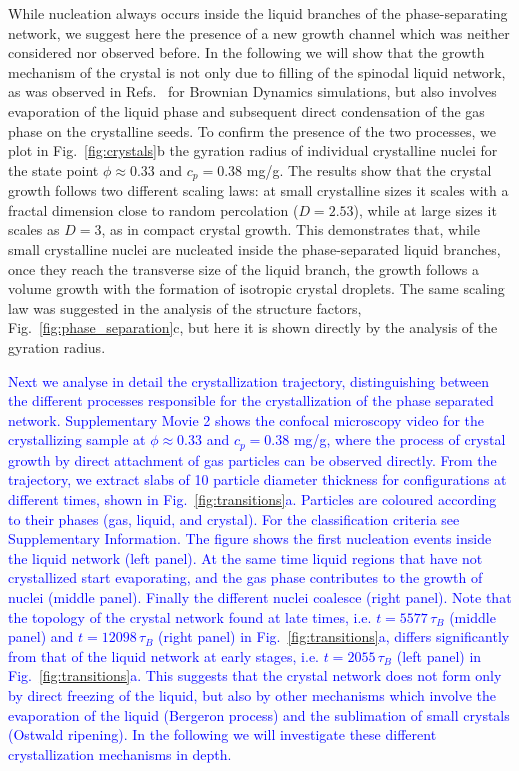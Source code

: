 \documentclass[preprint,amsmath,amssymb,superscriptaddress]{revtex4-1}
\begin{document}
While nucleation always occurs inside the liquid branches of the phase-separating network, we suggest here the presence of a new growth channel
which was neither considered nor observed before. In the following we will show that the growth mechanism of the crystal is not only due to filling of the spinodal liquid network, as was observed in Refs.~\cite{soga1999metastable,fortini2008crystallization,perez2011pathways} for Brownian Dynamics simulations, but also involves 
evaporation of the liquid phase and subsequent direct condensation of the gas phase on the crystalline seeds. 
To confirm the presence of the two processes, we plot in Fig.~\ref{fig:crystals}b the gyration radius of individual crystalline nuclei for the state point 
$\phi\approx 0.33$ and $c_p=0.38$ mg/g. The results show that the crystal growth follows two different scaling laws: at small crystalline sizes it scales with 
a fractal dimension close to random percolation ($D=2.53$), while at large sizes it scales as $D=3$, as in compact crystal growth. This demonstrates that, while 
small crystalline nuclei are nucleated inside the phase-separated liquid branches, once they reach the transverse size of the liquid branch, the growth 
follows a volume growth with the formation of isotropic crystal droplets. The same scaling law was suggested in the analysis of the
structure factors, Fig.~\ref{fig:phase_separation}c, but here it is shown directly by the analysis of the gyration radius. 

\textcolor{blue}{Next we analyse in detail the crystallization trajectory, distinguishing between the different processes responsible for the
crystallization of the phase separated network.
Supplementary Movie 2 shows the confocal microscopy video for the crystallizing sample at $\phi\approx 0.33$ and $c_p=0.38$ mg/g,
where the process of crystal growth by direct attachment of gas particles can be observed directly. 
From the trajectory, we extract slabs of 10 particle diameter thickness for configurations at different times, shown in Fig.~\ref{fig:transitions}a. 
Particles are coloured according to their phases (gas, liquid, and crystal). For the classification criteria see Supplementary Information. The figure shows the first nucleation 
events inside the liquid network (left panel). At the same time liquid regions that have not crystallized start evaporating, and the gas phase contributes to the growth of nuclei (middle panel). Finally the different nuclei coalesce (right panel). 
Note that the topology of the crystal network found at late times, i.e. $t=5577\,\tau_B$ (middle panel) and $t=12098\,\tau_B$ (right panel) in Fig.~\ref{fig:transitions}a, differs significantly from that of the liquid network at early stages, i.e. $t=2055\,\tau_B$ (left panel) in Fig.~\ref{fig:transitions}a. This suggests that the crystal network does not form only by direct freezing of the liquid, but also by other mechanisms which involve the evaporation of the liquid (Bergeron process) and the sublimation of small crystals (Ostwald ripening). In the following we will investigate these different crystallization mechanisms in depth.}
 
\end{document}
